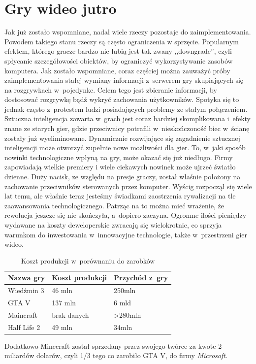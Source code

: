 \documentclass[brudnopis]{xmgr}
\begin{document}
\section{Gry wideo jutro}
Jak już zostało wspomniane, nadal wiele rzeczy pozostaje do
zaimplementowania. Powodem takiego stanu rzeczy są często ograniczenia w
sprzęcie. Popularnym efektem, którego gracze bardzo nie lubią jest tak
zwany ,,downgrade'', czyli spłycanie szczegółowości obiektów, by ograniczyć wykorzystywanie zasobów komputera. Jak zostało wspomniane, coraz częściej można zauważyć próby
zaimplementowania stałej wymiany informacji z~serwerem gry skupiających się na rozgrywkach w~pojedynke. Celem tego jest zbieranie informacji, by dostosować rozgrywkę bądź wykryć zachowania użytkowników. Spotyka się to jednak często z~protestem ludzi posiadających
problemy ze stałym połączeniem. Sztuczna inteligencja zawarta w~grach jest coraz bardziej skomplikowana i~efekty znane ze starych gier, gdzie przeciwnicy potrafili w~nieskończoność biec w~ścianę zostały już wyeliminowane. Dynamicznie rozwijające się zagadnienie sztucznej inteligencji może otworzyć zupełnie nowe możliwości dla gier.
To, w~jaki sposób nowinki technologiczne wpłyną na gry, może okazać się już niedługo. Firmy zapowiadają wielkie premiery i wiele ciekawych nowinek może ujrzeć światło dzienne. Duży nacisk, ze względu na presje graczy, został właśnie położony na zachowanie przeciwników sterowanych przez komputer. Wyścig rozpoczął się wiele lat temu, ale właśnie teraz jesteśmy świadkami zaostrzenia rywalizacji na tle zaawansowania technologicznego.
Patrząc na to można mieć wrażenie, że rewolucja jeszcze
się nie skończyła, a~dopiero zaczyna. Ogromne ilości pieniędzy wydawane na koszty
deweloperskie zwracają się wielokrotnie, co sprzyja warunkom do
inwestowania w~innowacyjne technologie, także w~przestrzeni gier wideo.

\begin{table}[!tbh]
\centering
\begin{tabular}{|l|l|l|} \hline
Nazwa gry & Koszt produkcji & Przychód z~gry \\ \hline
Wiedźmin 3 & 46 mln & 250mln \\ \hline
GTA V & 137 mln & 6 mld \\ \hline
Maincraft & brak danych & >280mln \\ \hline
Half Life 2 & 49 mln & 34mln \\ \hline
\end{tabular}
\caption{Koszt produkcji w~porównaniu do zarobków\label{tab:dtd-cmp}}
\end{table}
Dodatkowo Minecraft został sprzedany przez swojego twórce za kwote 2
miliardów dolarów, czyli 1/3 tego co zarobiło GTA V, do firmy {\em Microsoft}.
\end{document}
